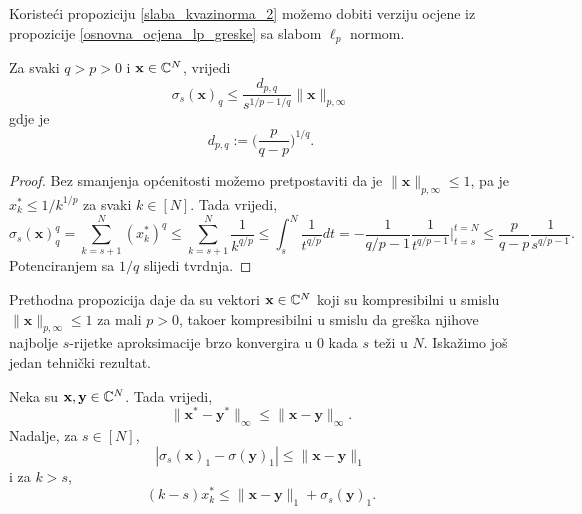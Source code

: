 \documentclass[a4paper,twoside,12pt]{memoir} %
\newcommand{\vect}[1]{\mathbf{#1}}
\renewcommand{\vec}{\vect}
\newcommand{\norm}[1]{\|{#1}\|}
\begin{document}
Koriste\'ci propoziciju \eqref{slaba_kvazinorma_2} mo\v{z}emo dobiti verziju ocjene iz propozicije \eqref{osnovna_ocjena_lp_greske} sa slabom $\ell_p$ normom.
\begin{prop}
    Za svaki $q>p>0$ i $\vec{x} \in \C^N$, vrijedi
    \begin{equation*}
        \sigma_s(\vec{x})_q \leq \frac{d_{p,q}}{s^{1/p-1/q}}\|\vec{x}\|_{p, \infty}
    \end{equation*}
    gdje je
    \begin{equation*}
        d_{p,q} := \big( \frac{p}{q-p} \big)^{1/q}.
    \end{equation*}
\end{prop}
\begin{proof}
    Bez smanjenja op\'cenitosti mo\v{z}emo pretpostaviti da je $\norm{\vec{x}}_{p,\infty} \leq 1$, pa je $x_k^* \leq 1/k^{1/p}$ za svaki $k \in [N]$. Tada vrijedi,
    \begin{equation*}
    \sigma_s(\vec{x})^q_q = \sum_{k=s+1}^{N} (x_k^*)^q \leq \sum_{k=s+1}^N \frac{1}{k^{q/p}} \leq \int_s^N \frac{1}{t^{q/p}} dt = - \frac{1}{q/p-1} \frac{1}{t^{q/p-1}}\bigg\rvert^{t=N}_{t=s} \leq \frac{p}{q-p} \frac{1}{s^{q/p-1}}.
    \end{equation*}
    Potenciranjem sa $1/q$ slijedi tvrdnja.
\end{proof}
Prethodna propozicija daje da su vektori $\vec{x} \in \C^N$ koji su kompresibilni u smislu $\norm{\vec{x}}_{p, \infty} \leq 1$ za mali $p>0$, tako\dj er kompresibilni u smislu da gre\v{s}ka njihove najbolje $s$-rijetke aproksimacije brzo konvergira u 0 kada $s$ te\v{z}i u $N$. Iska\v{z}imo jo\v{s} jedan tehni\v{c}ki rezultat.
\begin{lem}
    Neka su $\vec{x}, \vec{y} \in \C^N$. Tada vrijedi,
    \begin{equation} \label{nerastuci_poredak_ocjena_1}
        \norm{\vec{x}^* - \vec{y}^*}_{\infty} \leq \norm{\vec{x} - \vec{y}}_{\infty}.
    \end{equation}
    Nadalje, za $s \in [N]$,
    \begin{equation}\label{nerastuci_poredak_ocjena_2}
        |\sigma_s(\vec{x})_1 - \sigma(\vec{y})_1| \leq \norm{\vec{x} - \vec{y}}_1
    \end{equation}
    i za $k>s$,
    \begin{equation}\label{nerastuci_poredak_ocjena_3}
        (k-s)x_k^* \leq \norm{\vec{x} - \vec{y}}_1 + \sigma_s(\vec{y})_1.
    \end{equation}
\end{lem}
\end{document}
